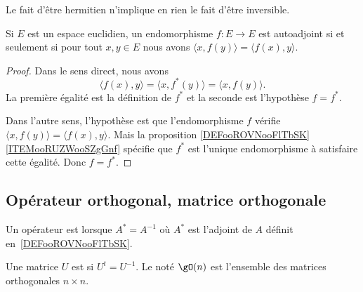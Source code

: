 \begin{remark}
    Le fait d'être hermitien n'implique en rien le fait d'être inversible.
\end{remark}

\begin{lemma}
    Si \( E\) est un espace euclidien, un endomorphisme \( f\colon E\to E\) est autoadjoint si et seulement si pour tout \( x,y\in E\) nous avons \( \langle x, f(y)\rangle=\langle f(x), y\rangle  \).
\end{lemma}

\begin{proof}
    Dans le sens direct, nous avons
    \begin{equation}
        \langle f(x), y\rangle =\langle x, f^*(y)\rangle =\langle x, f(y)\rangle .
    \end{equation}
    La première égalité est la définition de \( f^*\) et la seconde est l'hypothèse \( f=f^*\).

    Dans l'autre sens, l'hypothèse est que l'endomorphisme \( f\) vérifie \( \langle x, f(y)\rangle =\langle f(x), y\rangle \). Mais la proposition \ref{DEFooROVNooFlTbSK}\ref{ITEMooRUZWooSZgGnf} spécifie que \( f^*\) est l'unique endomorphisme à satisfaire cette égalité. Donc \( f=f^*\).
\end{proof}

\subsection{Opérateur orthogonal, matrice orthogonale}

\begin{definition}      \label{DEFooYKCSooURQDoS}
    Un opérateur est  lorsque \( A^*=A^{-1}\) où \( A^*\) est l'adjoint de \( A\) définit en~\ref{DEFooROVNooFlTbSK}.
\end{definition}

\begin{definition}      \label{DEFooUHANooLVBVID}
    Une matrice \( U\) est  si \( U^t=U^{-1}\). Le  noté \( \gO(n)\) est l'ensemble des matrices orthogonales \( n\times n\).
\end{definition}

